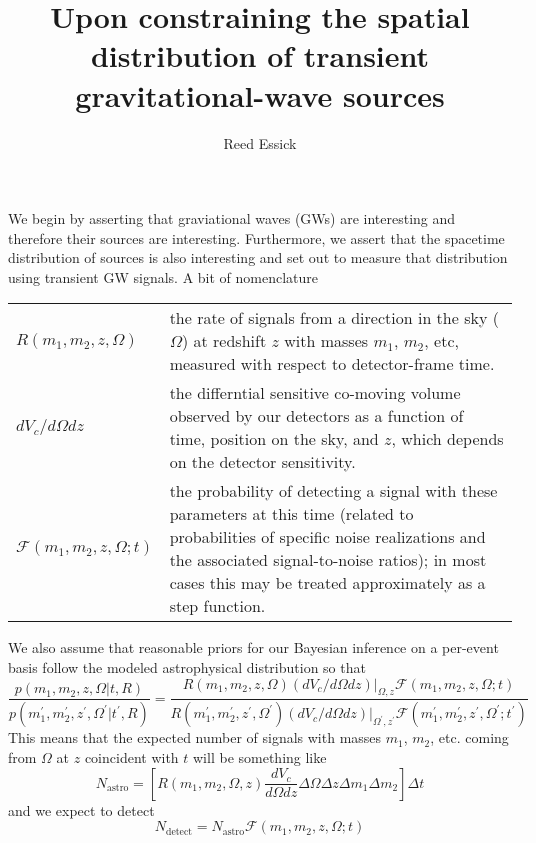 \documentclass{article}
\begin{document}
\title{
Upon constraining the spatial distribution of transient gravitational-wave sources
}

\author{
Reed Essick
}

\maketitle


\doublespace

We begin by asserting that graviational waves (GWs) are interesting and therefore their sources are interesting.
Furthermore, we assert that the spacetime distribution of sources is also interesting and set out to measure that distribution using transient GW signals.
A bit of nomenclature

\vspace{0.5cm}
\begin{tabular}{p{3cm}p{12cm}}
    $R(m_1, m_2, z, \Omega)$ & the rate of signals from a direction in the sky ($\Omega$) at redshift $z$ with masses $m_1$, $m_2$, etc, measured with respect to detector-frame time. \\
    $dV_c/d\Omega dz$     & the differntial sensitive co-moving volume observed by our detectors as a function of time, position on the sky, and $z$, which depends on the detector sensitivity. \\
    $\mathcal{F}(m_1,m_2,z,\Omega;t)$ & the probability of detecting a signal with these parameters at this time (related to probabilities of specific noise realizations and the associated signal-to-noise ratios); in most cases this may be treated approximately as a step function.
\end{tabular}

\vspace{0.5cm}
\noindent
We also assume that reasonable priors for our Bayesian inference on a per-event basis follow the modeled astrophysical distribution so that
\begin{equation}
    \frac{p(m_1, m_2, z, \Omega|t,R)}{p(m_1^\prime, m_2^\prime, z^\prime, \Omega^\prime|t^\prime,R)} = \frac{R(m_1, m_2, z, \Omega) \left.(dV_c/d\Omega dz)\right|_{\Omega, z} \mathcal{F}(m_1, m_2, z, \Omega; t)}{R(m_1^\prime, m_2^\prime, z^\prime, \Omega^\prime) \left.(dV_c/d\Omega dz)\right|_{\Omega^\prime, z^\prime} \mathcal{F}(m_1^\prime, m_2^\prime, z^\prime, \Omega^\prime; t^\prime)}
\end{equation}
This means that the expected number of signals with masses $m_1$, $m_2$, etc. coming from $\Omega$ at $z$ coincident with $t$ will be something like 
\begin{equation}
    N_\mathrm{astro} = \left[ R(m_1, m_2, \Omega, z) \frac{dV_c}{d\Omega dz} \Delta\Omega \Delta z \Delta m_1 \Delta m_2 \right] \Delta t
\end{equation}
and we expect to detect 
\begin{equation}
    N_\mathrm{detect} = N_\mathrm{astro} \mathcal{F}(m_1, m_2, z, \Omega; t)
\end{equation}
\end{document}
